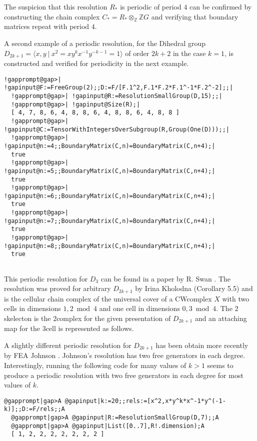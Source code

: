 \documentclass[a4paper,11pt]{report}
\begin{document}
{{\begin{Verbatim}[commandchars=!@|,fontsize=\small,frame=single,label=Example]
\end{Verbatim}
 The suspicion that this resolution $R_\ast$ is periodic of period $4$ can be confirmed by constructing the chain complex $C_\ast=R_\ast\otimes_{\mathbb Z}\mathbb ZG$ and verifying that boundary matrices repeat with period $4$. 

 A second example of a periodic resolution, for the Dihedral group $D_{2k+1}=\langle x, y\ |\ x^2= xy^kx^{-1}y^{-k-1} = 1\rangle$ of order $2k+2$ in the case $k=1$, is constructed and verified for periodicity in the next example. 
\begin{Verbatim}[commandchars=!@|,fontsize=\small,frame=single,label=Example]
  !gapprompt@gap>| !gapinput@F:=FreeGroup(2);;D:=F/[F.1^2,F.1*F.2*F.1^-1*F.2^-2];;|
  !gapprompt@gap>| !gapinput@R:=ResolutionSmallGroup(D,15);;|
  !gapprompt@gap>| !gapinput@Size(R);|
  [ 4, 7, 8, 6, 4, 8, 8, 6, 4, 8, 8, 6, 4, 8, 8 ]
  !gapprompt@gap>| !gapinput@C:=TensorWithIntegersOverSubgroup(R,Group(One(D)));;|
  !gapprompt@gap>| !gapinput@n:=4;;BoundaryMatrix(C,n)=BoundaryMatrix(C,n+4);|
  true
  !gapprompt@gap>| !gapinput@n:=5;;BoundaryMatrix(C,n)=BoundaryMatrix(C,n+4);|
  true
  !gapprompt@gap>| !gapinput@n:=6;;BoundaryMatrix(C,n)=BoundaryMatrix(C,n+4);|
  true
  !gapprompt@gap>| !gapinput@n:=7;;BoundaryMatrix(C,n)=BoundaryMatrix(C,n+4);|
  true
  !gapprompt@gap>| !gapinput@n:=8;;BoundaryMatrix(C,n)=BoundaryMatrix(C,n+4);|
  true
  
\end{Verbatim}
 This periodic resolution for $D_3$ can be found in a paper by R. Swan \cite{swan2}. The resolution was proved for arbitrary $D_{2k+1}$ by Irina Kholodna \cite{kholodna} (Corollary 5.5) and is the cellular chain complex of the universal cover of a
CW\texttt{}complex $X$ with two cells in dimensions $1, 2 \bmod 4$ and one cell in dimensions $0,3 \bmod 4$. The $2$\texttt{}skelecton is the $2$\texttt{}complex for the given presentation of $D_{2k+1}$ and an attaching map for the $3$\texttt{}cell is represented as follows. 

  

 A slightly different periodic resolution for $D_{2k+1}$ has been obtain more recently by FEA Johnson \cite{johnson}. Johnson's resolution has two free generators in each degree. Interestingly,
running the following code for many values of $k >1$ seems to produce a periodic resolution with two free generators in each degree
for most values of $k$. 
\begin{Verbatim}[commandchars=@|A,fontsize=\small,frame=single,label=Example]
  @gapprompt|gap>A @gapinput|k:=20;;rels:=[x^2,x*y^k*x^-1*y^(-1-k)];;D:=F/rels;;A
  @gapprompt|gap>A @gapinput|R:=ResolutionSmallGroup(D,7);;A
  @gapprompt|gap>A @gapinput|List([0..7],R!.dimension);A
  [ 1, 2, 2, 2, 2, 2, 2, 2 ]
  

\end{Verbatim}}}
\end{document}
